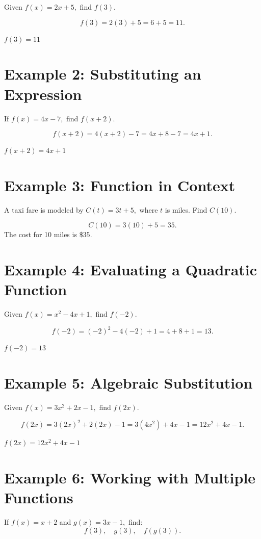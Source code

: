 \documentclass[14pt]{extarticle}
\begin{document}
Given \(f(x) = 2x + 5,\) find \(f(3).\)

\[
f(3) = 2(3) + 5 = 6 + 5 = 11.
\]

\(\boxed{f(3) = 11}\)

\section*{Example 2: Substituting an Expression}

If \(f(x) = 4x - 7,\) find \(f(x + 2).\)

\[
f(x + 2) = 4(x + 2) - 7 = 4x + 8 - 7 = 4x + 1.
\]

\(\boxed{f(x + 2) = 4x + 1}\)

\section*{Example 3: Function in Context}

A taxi fare is modeled by \(C(t) = 3t + 5,\) where \(t\) is miles.  
Find \(C(10)\).

\[
C(10) = 3(10) + 5 = 35.
\]
The cost for 10 miles is \(\boxed{\$35}.\)

\section*{Example 4: Evaluating a Quadratic Function}

Given \(f(x) = x^2 - 4x + 1,\) find \(f(-2)\).

\[
f(-2) = (-2)^2 - 4(-2) + 1 = 4 + 8 + 1 = 13.
\]

\(\boxed{f(-2) = 13}\)

\section*{Example 5: Algebraic Substitution}

Given \(f(x) = 3x^2 + 2x - 1,\) find \(f(2x).\)

\[
f(2x) = 3(2x)^2 + 2(2x) - 1 = 3(4x^2) + 4x - 1 = 12x^2 + 4x - 1.
\]

\(\boxed{f(2x) = 12x^2 + 4x - 1}\)

\section*{Example 6: Working with Multiple Functions}

If \(f(x) = x + 2\) and \(g(x) = 3x - 1,\) find:
\[
f(3), \quad g(3), \quad f(g(3)).
\]
\end{document}
